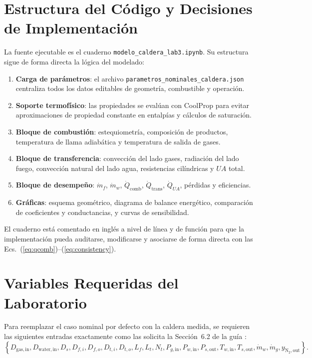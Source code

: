 \documentclass[conference]{IEEEtran}
\begin{document}
\section{Estructura del C\'odigo y Decisiones de Implementaci\'on}
La fuente ejecutable es el cuaderno \texttt{modelo\_caldera\_lab3.ipynb}. Su estructura sigue de forma directa la l\'ogica del modelado:
\begin{enumerate}
\item \textbf{Carga de par\'ametros}: el archivo \texttt{parametros\_nominales\_caldera.json} centraliza todos los datos editables de geometr\'ia, combustible y operaci\'on.
\item \textbf{Soporte termof\'isico}: las propiedades se eval\'uan con CoolProp para evitar aproximaciones de propiedad constante en entalp\'ias y c\'alculos de saturaci\'on.
\item \textbf{Bloque de combusti\'on}: estequiometr\'ia, composici\'on de productos, temperatura de llama adiab\'atica y temperatura de salida de gases.
\item \textbf{Bloque de transferencia}: convecci\'on del lado gases, radiaci\'on del lado fuego, convecci\'on natural del lado agua, resistencias cil\'indricas y $UA$ total.
\item \textbf{Bloque de desempe\~no}: $\dot{m}_f$, $\dot{m}_w$, $\dot{Q}_{\mathrm{comb}}$, $\dot{Q}_{\mathrm{trans}}$, $\dot{Q}_{UA}$, p\'erdidas y eficiencias.
\item \textbf{Gr\'aficas}: esquema geom\'etrico, diagrama de balance energ\'etico, comparaci\'on de coeficientes y conductancias, y curvas de sensibilidad.
\end{enumerate}

El cuaderno est\'a comentado en ingl\'es a nivel de l\'inea y de funci\'on para que la implementaci\'on pueda auditarse, modificarse y asociarse de forma directa con las Ecs.~(\ref{eq:qcomb})--(\ref{eq:consistency}).

\section{Variables Requeridas del Laboratorio}
Para reemplazar el caso nominal por defecto con la caldera medida, se requieren las siguientes entradas exactamente como las solicita la Secci\'on~6.2 de la gu\'ia \cite{uniandes2026}:
\begin{equation}
\left\{
D_{\mathrm{gas,in}},
D_{\mathrm{water,in}},
D_s,
D_{f,i},D_{f,o},
D_{t,i},D_{t,o},
L_f,L_t,
N_t,
P_{g,\mathrm{in}},
P_{w,\mathrm{in}},
P_{s,\mathrm{out}},
T_{w,\mathrm{in}},
T_{s,\mathrm{out}},
\dot{m}_w,
\dot{m}_g,
y_{\mathrm{N_2,out}}
\right\}.
\label{eq:reqdata}
\end{equation}
\end{document}
